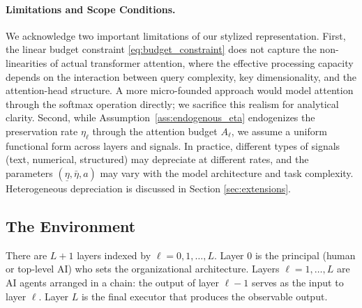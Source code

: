 \paragraph{Limitations and Scope Conditions.} We acknowledge two important limitations of our stylized representation. First, the linear budget constraint \eqref{eq:budget_constraint} does not capture the non-linearities of actual transformer attention, where the effective processing capacity depends on the interaction between query complexity, key dimensionality, and the attention-head structure. A more micro-founded approach would model attention through the softmax operation directly; we sacrifice this realism for analytical clarity. Second, while Assumption~\ref{ass:endogenous_eta} endogenizes the preservation rate $\eta_\ell$ through the attention budget $A_\ell$, we assume a uniform functional form across layers and signals. In practice, different types of signals (text, numerical, structured) may depreciate at different rates, and the parameters $(\underline{\eta}, \bar{\eta}, a)$ may vary with the model architecture and task complexity. Heterogeneous depreciation is discussed in Section \ref{sec:extensions}.


\subsection{The Environment}
\label{subsec:environment}

\begin{assumption}[Hierarchy]\label{ass:hierarchy}
There are $L+1$ layers indexed by $\ell = 0, 1, \ldots, L$. Layer $0$ is the principal (human or top-level AI) who sets the organizational architecture. Layers $\ell = 1, \ldots, L$ are AI agents arranged in a chain: the output of layer $\ell-1$ serves as the input to layer $\ell$. Layer $L$ is the final executor that produces the observable output.
\end{assumption}

